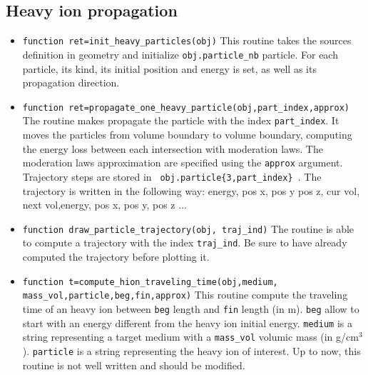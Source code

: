 \documentclass[10pt]{article}
\begin{document}
		\subsection{Heavy ion propagation}
		\begin{itemize}
		\item \lstinline{function ret=init_heavy_particles(obj)} This routine takes the sources definition in geometry and initialize \lstinline{obj.particle_nb} particle. For each particle, its kind, its initial position and energy is set, as well as its propagation direction.
		
		\item \lstinline{function ret=propagate_one_heavy_particle(obj,part_index,approx)} The routine makes propagate the particle with the index \lstinline{part_index}. It moves the particles from volume boundary to volume boundary, computing the energy loss between each intersection with moderation laws. The moderation laws approximation are specified using the \lstinline{approx} argument. Trajectory steps are stored in \lstinline| obj.particle{3,part_index} |. The trajectory is written in the following way: energy, pos x, pos y pos z, cur vol, next vol,energy, pos x, pos y, pos z ... 
		\item \lstinline{function draw_particle_trajectory(obj, traj_ind)}
		The routine is able to compute a trajectory with the index \lstinline{traj_ind}. Be sure to have already computed the trajectory before plotting it.
		\item \lstinline{function t=compute_hion_traveling_time(obj,medium, mass_vol,particle,beg,fin,approx)} This routine compute the traveling time of an heavy ion between \lstinline{beg} length and \lstinline{fin} length (in m). \lstinline{beg} allow to start with an energy different from the heavy ion initial energy. \lstinline{medium} is a string representing a target medium with a \lstinline{mass_vol} volumic mass (in g/cm$^{3}$). \lstinline{particle} is a string representing the heavy ion of interest. Up to now, this routine is not well written and should be modified.
		
		\end{itemize}
\end{document}
